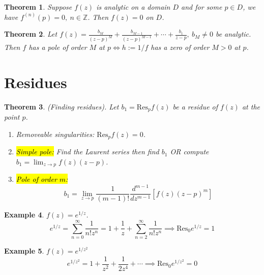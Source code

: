 \documentclass{article}
\newtheorem{theorem}{Theorem}[section]
\newtheorem{example}[theorem]{Example}
\theoremstyle{definition}
\begin{document}
\begin{theorem}
    Suppose $f(z)$ is analytic on a domain $D$ and for some $p \in D$, we have $f^{(n)}(p) = 0,\ n \in \mathbb{Z}$. Then $f(z) = 0$ on $D$.
\end{theorem}

\begin{theorem}
    Let $f(z) = \frac{b_M}{(z-p)^M} + \frac{b_{M-1}}{(z-p)^{M-1}} + \cdots + \frac{b_1}{z-p},\ b_M \neq 0$ be analytic. Then $f$ has a pole of order $M$ at $p \iff h:=1/f$ has a zero of order $M>0$ at $p$.
\end{theorem}

\section{Residues}

\begin{theorem}
    (Finding residues). Let $b_1 = \text{Res}_p f(z)$ be a residue of $f(z)$ at the point $p$.
    \begin{enumerate}
        \item Removeable singularities: $\text{Res}_p f(z) = 0$.
        \item \hl{Simple pole:} Find the Laurent series then find $b_1$ OR compute $b_1 = \lim_{z \to p} f(z)(z-p)$.
        \item \hl{Pole of order $m$:}
        \begin{equation*}
            b_1 = \lim_{z \to p} \frac{1}{(m-1)!} \frac{d^{m-1}}{dz^{m-1}} \left[ f(z) (z-p)^m \right]
        \end{equation*}
    \end{enumerate}
\end{theorem}

\begin{example} \normalfont
    $f(z) = e^{1/z}$.
    \begin{equation*}
        e^{1/z} = \sum_{n=0}^\infty \frac{1}{n! z^n} = 1 + \frac{1}{z} + \sum_{n=2}^\infty \frac{1}{n! z^n} \implies \text{Res}_0 e^{1/z} = 1
    \end{equation*}
\end{example}

\begin{example} \normalfont
    $f(z) = e^{1/z^2}$
    \begin{equation*}
        e^{1/z^2} = 1 + \frac{1}{z^2} + \frac{1}{2z^4} + \cdots \implies \text{Res}_0 e^{1/z^2} = 0
    \end{equation*}
\end{example}
\end{document}
